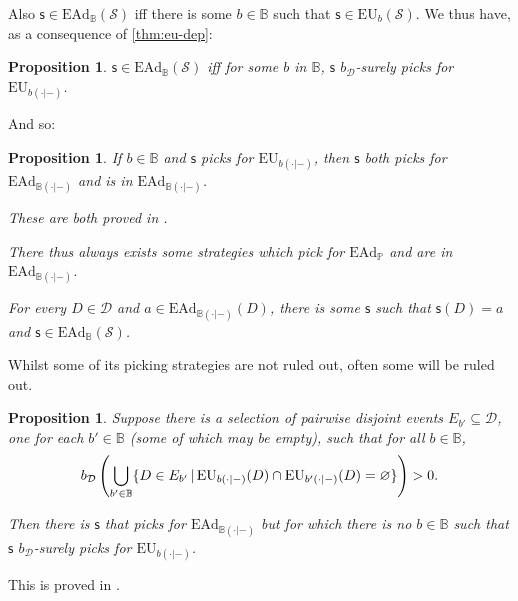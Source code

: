 \documentclass[a4paper]{article}
\newtheorem{proposition}[theorem]{Proposition}
\renewcommand\P{\mathbb{P}} %
\newcommand\EU{\mathrm{EU}}
\newcommand\EAd{\mathrm{EAd}}
\newcommand{\Decs}{\mathcal{D}}
\renewcommand\S{\mathcal{S}}
\newcommand\s{\mathsf{s}}
\newcommand{\IB}{\mathbb{B}}
\newcommand{\IP}{\P}
\renewcommand{\color}[1]{}
\newenvironment{colored}[1]{\leavevmode\color{#1}}{}
\newcommand{\Strategies}{\S}
\newcommand\SetDelimiter[1][]{
	\nonscript\,#1\vert \allowbreak \nonscript\,\mathopen{}}
\providecommand\given{\SetDelimiter}
\renewcommand{\emptyset}{\varnothing}
\newenvironment{CCM rewritten}
{\begingroup\color{blue}} %
{\endgroup}              %
\begin{document}
	Also $\s\in\EAd_\IB(\Strategies)$ iff there is some $b\in\IB$ such that $\s\in\EU_b(\Strategies)$. 
	We thus have, as a consequence of \cref{thm:eu-dep}: 
	\begin{proposition}\label{thm:ead-equiv[dep]}
		$\s\in\EAd_\IB(\Strategies)$ iff for some $b$ in $\IB$, $\s$ $b_\Decs$-surely picks for $\EU_{b(\cdot|-)}$.
	\end{proposition}
	And so:
	 \begin{proposition}\label{thm:ead-existence[dep]}
	 	If $b\in\IB$ and $\s$ picks for $\EU_{b(\cdot|-)}$, then $\s$ both picks for $\EAd_{\IB(\cdot|-)}$ and is in $\EAd_{\IB(\cdot|-)}$.
		
		These are both proved in .
	 	
	 	There thus always exists some strategies which pick for $\EAd_\IP$ and are in $\EAd_{\IB(\cdot|-)}$. 
		
		For every $D\in\Decs$ and $a\in\EAd_{\IB(\cdot|-)}(D)$, there is some $\s$ such that $\s(D)=a$ and $\s\in\EAd_\IB(\S)$. 
	\end{proposition}

	Whilst some of its picking strategies are not ruled out, often some will be ruled out. 
		
\begin{proposition}\label{thm:ead-existsimpermissible[dep]}
Suppose there is a selection of pairwise disjoint events $E_{b'}\subseteq\Decs$, one for each $b'\in\IB$ (some of which may be empty),  such that for all $b\in\IB$, $$b_\Decs\left(\bigcup_{b'\in\IB}\{D\in E_{b'}\given \EU_{b(\cdot|-)}(D)\cap \EU_{b'(\cdot|-)}(D)=\emptyset\}\right)>0.$$

Then there is $\s$ that picks for $\EAd_{\IB(\cdot|-)}$ but for which there is no $b\in\IB$ such that $\s$  $b_\Decs$-surely picks for $\EU_{b(\cdot|-)}$. 
\end{proposition}
This is proved in .
\end{document}
